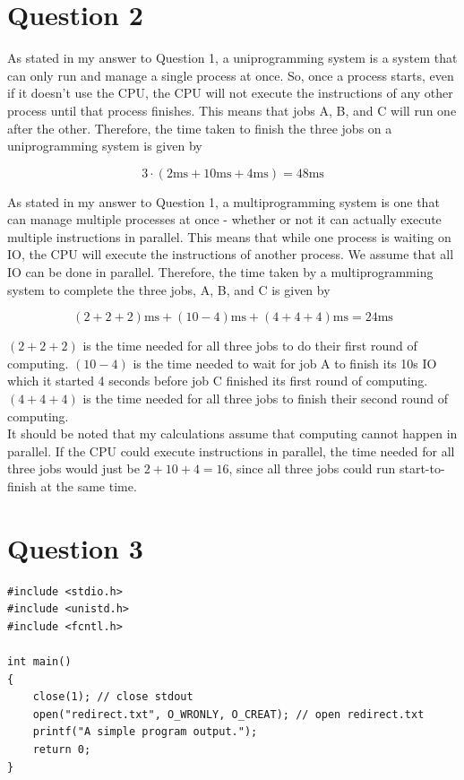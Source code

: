 \documentclass[11pt, letterpaper]{article}
\begin{document}
\newpage

\section*{Question 2}

As stated in my answer to Question 1, a uniprogramming system is a system that can only run and manage a single process at once.  So, once a process starts, even if it doesn't use the CPU, the CPU will not execute the instructions of any other process until that process finishes.  This means that jobs A, B, and C will run one after the other.  Therefore, the time taken to finish the three jobs on a uniprogramming system is given by

$$3 \cdot (2\text{ms} + 10\text{ms} + 4\text{ms}) = 48\text{ms}$$

As stated in my answer to Question 1, a multiprogramming system is one that can manage multiple processes at once - whether or not it can actually execute multiple instructions in parallel.  This means that while one process is waiting on IO, the CPU will execute the instructions of another process. We assume that all IO can be done in parallel.  Therefore, the time taken by a multiprogramming system to complete the three jobs, A, B, and C is given by

$$(2 + 2 + 2)\text{ms} + (10 - 4)\text{ms} + (4 + 4 + 4)\text{ms} = 24\text{ms}$$

$(2 + 2 + 2)$ is the time needed for all three jobs to do their first round of computing. $(10 - 4)$ is the time needed to wait for job A to finish its 10s IO which it started 4 seconds before job C finished its first round of computing. $(4 + 4 +4)$ is the time needed for all three jobs to finish their second round of computing. \\

It should be noted that my calculations assume that computing cannot happen in parallel.  If the CPU could execute instructions in parallel, the time needed for all three jobs would just be $2 + 10 + 4 = 16$, since all three jobs could run start-to-finish at the same time.

\section*{Question 3}

\begin{verbatim}
#include <stdio.h>
#include <unistd.h>
#include <fcntl.h>

int main()
{
    close(1); // close stdout
    open("redirect.txt", O_WRONLY, O_CREAT); // open redirect.txt
    printf("A simple program output.");
    return 0;
}
\end{verbatim}
\end{document}
